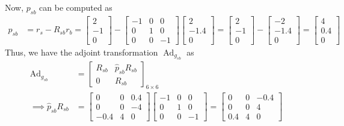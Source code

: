 Now, \( p_{s b} \) can be computed as
\begin{align*}
    p_{s b}
     & =
    r_{s} - R_{s b} r_{b}
    =
    \begin{bmatrix}
        2  \\
        -1 \\
        0
    \end{bmatrix}
    -
    \begin{bmatrix}
        -1 & 0 & 0  \\
        0  & 1 & 0  \\
        0  & 0 & -1
    \end{bmatrix}
    \begin{bmatrix}
        2    \\
        -1.4 \\
        0
    \end{bmatrix}
    =
    \begin{bmatrix}
        2  \\
        -1 \\
        0
    \end{bmatrix}
    -
    \begin{bmatrix}
        -2   \\
        -1.4 \\
        0
    \end{bmatrix}
    =
    \begin{bmatrix}
        4   \\
        0.4 \\
        0
    \end{bmatrix}
\end{align*}
Thus, we have the adjoint transformation \( \operatorname{Ad}_{g_{s b}} \) as
\begin{align*}
    \operatorname{Ad}_{g_{s b}}
     & =
    \begin{bmatrix}
        R_{s b} & \widehat{p}_{s b} R_{s b} \\
        0       & R_{s b}
    \end{bmatrix}_{6 \times 6}
    \\
    \implies
    \widehat{p}_{s b} R_{s b}
     & =
    \begin{bmatrix}
        0    & 0 & 0.4 \\
        0    & 0 & -4  \\
        -0.4 & 4 & 0
    \end{bmatrix}
    \begin{bmatrix}
        -1 & 0 & 0  \\
        0  & 1 & 0  \\
        0  & 0 & -1
    \end{bmatrix}
    =
    \begin{bmatrix}
        0   & 0 & -0.4 \\
        0   & 0 & 4    \\
        0.4 & 4 & 0
    \end{bmatrix}
\end{align*}

